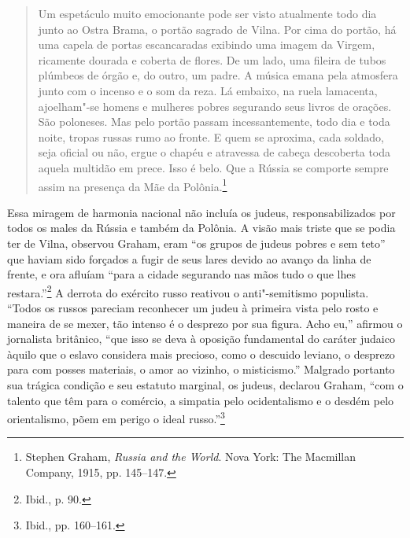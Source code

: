 \begin{quote}
Um espetáculo muito emocionante pode ser visto atualmente todo dia junto
ao Ostra Brama, o portão sagrado de Vilna. Por cima do portão, há uma
capela de portas escancaradas exibindo uma imagem da Virgem, ricamente
dourada e coberta de flores. De um lado, uma fileira de tubos plúmbeos
de órgão e, do outro, um padre. A música emana pela atmosfera junto com
o incenso e o som da reza. Lá embaixo, na ruela lamacenta, ajoelham"-se
homens e mulheres pobres segurando seus livros de orações. São
poloneses. Mas pelo portão passam incessantemente, todo dia e toda
noite, tropas russas rumo ao fronte. E quem se aproxima, cada soldado,
seja oficial ou não, ergue o chapéu e atravessa de cabeça descoberta
toda aquela multidão em prece. Isso é belo. Que a Rússia se comporte
sempre assim na presença da Mãe da Polônia.\footnote{Stephen Graham, \textit{Russia and the World}. Nova York: The Macmillan Company, 1915, pp. 145--147.} 
\end{quote}

Essa miragem de harmonia nacional não incluía os judeus,
responsabilizados por todos os males da Rússia e também da Polônia. A
visão mais triste que se podia ter de Vilna, observou Graham, eram ``os
grupos de judeus pobres e sem teto'' que haviam sido forçados a fugir de
seus lares devido ao avanço da linha de frente, e ora afluíam ``para a
cidade segurando nas mãos tudo o que lhes restara.''\footnote{Ibid., p. 90.} A derrota do exército russo reativou o anti"-semitismo populista. ``Todos os russos pareciam reconhecer um judeu à primeira vista pelo
rosto e maneira de se mexer, tão intenso é o desprezo por sua figura.
Acho eu,'' afirmou o jornalista britânico, ``que isso se deva à oposição
fundamental do caráter judaico àquilo que o eslavo considera mais
precioso, como o descuido leviano, o desprezo para com posses
materiais, o amor ao vizinho, o misticismo.'' Malgrado portanto sua
trágica condição e seu estatuto marginal, os judeus, declarou Graham,
``com o talento que têm para o comércio, a simpatia pelo ocidentalismo e
o desdém pelo orientalismo, põem em perigo o ideal russo.''\footnote{Ibid., pp. 160--161.}

